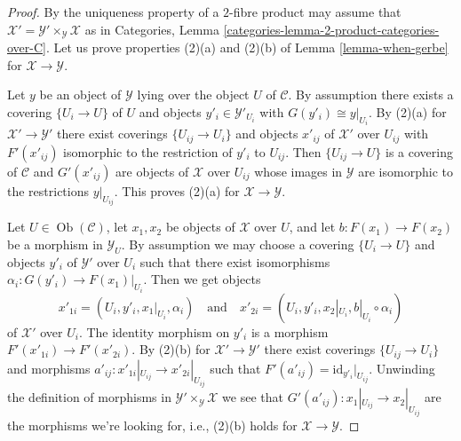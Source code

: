 \documentclass{stacks-project}
\theoremstyle{plain}
\theoremstyle{definition}
\theoremstyle{remark}
\numberwithin{equation}{subsection}
\def\Ob{\mathop{\mathrm{Ob}}\nolimits}
\begin{document}
\begin{proof}
By the uniqueness property of a $2$-fibre product may assume that
$\mathcal{X}' = \mathcal{Y}' \times_\mathcal{Y} \mathcal{X}$
as in
Categories, Lemma \ref{categories-lemma-2-product-categories-over-C}.
Let us prove properties (2)(a) and (2)(b) of
Lemma \ref{lemma-when-gerbe}
for $\mathcal{X} \to \mathcal{Y}$.

\medskip\noindent
Let $y$ be an object of $\mathcal{Y}$ lying over the object $U$
of $\mathcal{C}$. By assumption there exists
a covering $\{U_i \to U\}$ of $U$ and objects
$y'_i \in \mathcal{Y}'_{U_i}$ with $G(y'_i) \cong y|_{U_i}$.
By (2)(a) for $\mathcal{X}' \to \mathcal{Y}'$ there exist
coverings $\{U_{ij} \to U_i\}$ and objects $x'_{ij}$ of
$\mathcal{X}'$ over $U_{ij}$ with $F'(x'_{ij})$ isomorphic
to the restriction of $y'_i$ to $U_{ij}$. Then
$\{U_{ij} \to U\}$ is a covering of $\mathcal{C}$ and
$G'(x'_{ij})$ are objects of $\mathcal{X}$ over $U_{ij}$
whose images in $\mathcal{Y}$ are isomorphic to the restrictions
$y|_{U_{ij}}$. This proves (2)(a) for $\mathcal{X} \to \mathcal{Y}$.

\medskip\noindent
Let $U \in \Ob(\mathcal{C})$, let $x_1, x_2$ be objects of
$\mathcal{X}$ over $U$, and let $b : F(x_1) \to F(x_2)$ be a morphism
in $\mathcal{Y}_U$. By assumption we may choose a covering
$\{U_i \to U\}$ and objects $y'_i$ of $\mathcal{Y}'$
over $U_i$ such that there exist isomorphisms
$\alpha_i : G(y'_i) \to F(x_1)|_{U_i}$.
Then we get objects
$$
x'_{1i} = (U_i, y'_i, x_1|_{U_i}, \alpha_i)
\quad\text{and}\quad
x'_{2i} = (U_i, y'_i, x_2|_{U_i}, b|_{U_i} \circ \alpha_i)
$$
of $\mathcal{X}'$ over $U_i$. The identity morphism on $y'_i$ is a
morphism $F'(x'_{1i}) \to F'(x'_{2i})$. By (2)(b) for
$\mathcal{X}' \to \mathcal{Y}'$ there exist coverings
$\{U_{ij} \to U_i\}$ and morphisms
$a'_{ij} : x'_{1i}|_{U_{ij}} \to x'_{2i}|_{U_{ij}}$
such that $F'(a'_{ij}) = \text{id}_{y'_i}|_{U_{ij}}$. Unwinding the definition
of morphisms in $\mathcal{Y}' \times_\mathcal{Y} \mathcal{X}$
we see that $G'(a'_{ij}) : x_1|_{U_{ij}} \to x_2|_{U_{ij}}$ are
the morphisms we're looking for, i.e., (2)(b) holds for
$\mathcal{X} \to \mathcal{Y}$.
\end{proof}
\end{document}
